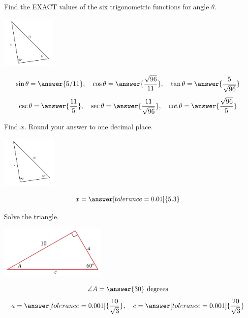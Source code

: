 \documentclass{ximera}
\begin{document}
\begin{problem}\label{prob:160hom10prob3}
Find the EXACT values of the six trigonometric functions for angle $\theta$. 
 
 \begin{image}
   
\includegraphics[height=1in]{160H10pic6.jpg}

\end{image}

$$\sin\theta=\answer{5/11},\quad \cos\theta=\answer{\frac{\sqrt{96}}{11}},\quad\tan\theta=\answer{\frac{5}{\sqrt{96}}}$$
$$\csc\theta=\answer{\frac{11}{5}},\quad\sec\theta=\answer{\frac{11}{\sqrt{96}}},\quad\cot\theta=\answer{\frac{\sqrt{96}}{5}}$$
\end{problem}

\begin{problem}\label{prob:160hom10prob4}
Find $x$.  Round your answer to one decimal place.
 
 \begin{image}
   
\includegraphics[height=1in]{160H10pic7.jpg}

\end{image}
$$x=\answer[tolerance=0.01]{5.3}$$
\end{problem}


\begin{problem}\label{prob:160hom10prob5}
Solve the triangle.
\begin{image}
   
\includegraphics[height=1in]{160H10pic3.jpg}~
 
\end{image}

$$\angle A=\answer{30}\mbox{ degrees}$$
$$a=\answer[tolerance=0.001]{\frac{10}{\sqrt{3}}},\quad c=\answer[tolerance=0.001]{\frac{20}{\sqrt{3}}}$$
\end{problem}
\end{document}
